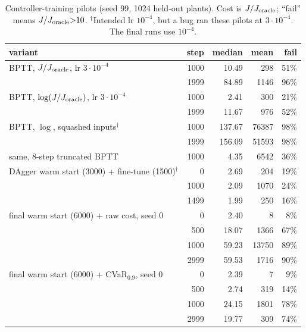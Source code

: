 \begin{table}[h]
\centering\small
\caption{Controller-training pilots (seed 99, 1024 held-out plants). Cost is $J/J_{\rm oracle}$; ``fail'' means $J/J_{\rm oracle}{>}10$. $^\dagger$Intended lr $10^{-4}$, but a bug ran these pilots at $3{\cdot}10^{-4}$. The final runs use $10^{-4}$.}\label{tab:pilots}
\begin{tabular}{lrrrr}
\toprule
variant & step & median & mean & fail \\
\midrule
BPTT, $J/J_{\rm oracle}$, lr $3{\cdot}10^{-4}$ & 1000 & 10.49 & 298 & 51\% \\
 & 1999 & 84.89 & 1146 & 96\% \\
BPTT, $\log(J/J_{\rm oracle})$, lr $3{\cdot}10^{-4}$ & 1000 & 2.41 & 300 & 21\% \\
 & 1999 & 11.67 & 976 & 52\% \\
BPTT, $\log$, squashed inputs$^\dagger$ & 1000 & 137.67 & 76387 & 98\% \\
 & 1999 & 156.09 & 51593 & 98\% \\
same, 8-step truncated BPTT & 1000 & 4.35 & 6542 & 36\% \\
DAgger warm start (3000) + fine-tune (1500)$^\dagger$ & 0 & 2.69 & 204 & 19\% \\
 & 1000 & 2.09 & 1070 & 24\% \\
 & 1499 & 1.99 & 250 & 16\% \\
final warm start (6000) + raw cost, seed 0 & 0 & 2.40 & 8 & 8\% \\
 & 500 & 18.07 & 1366 & 67\% \\
 & 1000 & 59.23 & 13750 & 89\% \\
 & 2999 & 59.53 & 1716 & 90\% \\
final warm start (6000) + CVaR$_{0.9}$, seed 0 & 0 & 2.39 & 7 & 9\% \\
 & 500 & 2.74 & 319 & 14\% \\
 & 1000 & 24.15 & 1801 & 78\% \\
 & 2999 & 19.77 & 309 & 74\% \\
\bottomrule
\end{tabular}
\end{table}
